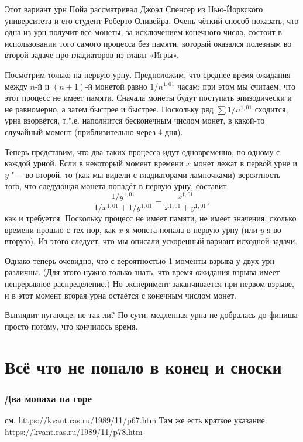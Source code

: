 \documentclass[twoside]{book}
\begin{document}
Этот вариант урн Пойа рассматривал Джоэл Спенсер из Нью-Йоркского университета и его студент Роберто Оливейра.
Очень чёткий способ показать, что одна из урн получит все монеты, за исключением конечного числа, состоит в использовании того самого процесса без памяти, который оказался полезным во второй задаче про гладиаторов из главы «\mbox{Игры}».

\medskip

Посмотрим только на первую урну.
Предположим, что среднее время ожидания между $n$-й и $(n+1)$-й монетой равно 
$1/n^{1{,}01}$ часам; при этом мы считаем, что этот процесс не имеет памяти.
Сначала монеты будут поступать эпизодически и не равномерно, а затем быстрее и быстрее.
Поскольку ряд $\sum 1/n^{1{,}01}$ сходится, урна взорвётся, т.",е. наполнится бесконечным числом монет, в какой-то случайный момент (приблизительно через 4 дня).

Теперь представим, что два таких процесса идут одновременно, по одному с каждой урной.
Если в некоторый момент времени $x$ монет лежат в первой урне и $y$ "--- во второй, то (как мы видели с гладиаторами-лампочками) 
вероятность того, что следующая монета попадёт в первую урну, составит
\[\frac{1/y^{1{,}01}}{1/x^{1{,}01}+1/y^{1{,}01}}=\frac{x^{1{,}01}}{x^{1{,}01}+y^{1{,}01}},\]
как и требуется.
Поскольку процесс не имеет памяти,
не имеет значения, сколько времени прошло с тех пор, как $x$-я монета попала в первую урну (или $y$-я во вторую).
Из этого следует, что мы описали ускоренный вариант исходной задачи.

Однако теперь очевидно, что с вероятностью 1 моменты взрыва у двух урн различны.
(Для этого нужно только знать, что время ожидания взрыва имеет непрерывное распределение.)
Но эксперимент заканчивается при первом взрыве, и в этот момент вторая урна остаётся с конечным числом монет.\heart

Выглядит пугающе, не так ли?
По сути, медленная урна не добралась до финиша просто потому, что кончилось время.

\section*{Всё что не попало в конец и сноски}
 
\subsubsection{Два монаха на горе}
см. \url{https://kvant.ras.ru/1989/11/p67.htm}
Там же есть краткое указание:  \url{https://kvant.ras.ru/1989/11/p78.htm} 
\end{document}
